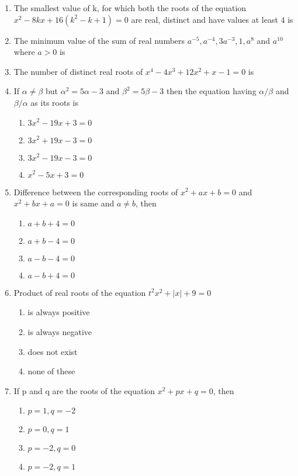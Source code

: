 \documentclass[journal,12pt,twocolumn]{IEEEtran}
\begin{document}
\begin{enumerate}[label=\arabic*]
\item The smallest value of k, for which both the roots of the equation $x^2-8kx+16(k^2-k+1)=0$ are real, distinct and have values at least $4$ is

\item The minimum value of the sum of real numbers $a^{-5}, a^{-4}, 3a^{-3}, 1, a^8$ and $a^{10}$ where $a>0$ is

\item The number of distinct real roots of $x^4-4x^3+12x^2+x-1=0$ is

\item If $\alpha\neq\beta$ but $\alpha^2=5\alpha-3$ and $\beta^2=5\beta-3$ then the equation having $\alpha/\beta$ and $\beta/\alpha$ as its roots is 
\begin{enumerate}
\item $3x^2-19x+3=0$
\item $3x^2+19x-3=0$ 
\item $3x^2-19x-3=0$
\item $x^2-5x+3=0$ 
\end{enumerate}

\item Difference between the corresponding roots of $x^2+ax+b=0$ and $x^2+bx+a=0$ is same and $a\neq{b}$, then
\begin{enumerate}
\item $a+b+4=0$
\item $a+b-4=0$ 
\item $a-b-4=0$
\item $a-b+4=0$
\end{enumerate}

\item Product of real roots of the equation $t^2x^2+|x|+9=0$
\begin{enumerate}
\item is always positive
\item is always negative 
\item does not exist
\item none of these 
\end{enumerate}

\item If p and q are the roots of the equation $x^2+px+q=0$, then
\begin{enumerate}
\item $p=1, q=-2$
\item $p=0, q=1$ 
\item $p=-2, q=0$
\item $p=-2, q=1$ 
\end{enumerate}


\end{enumerate}
\end{document}
